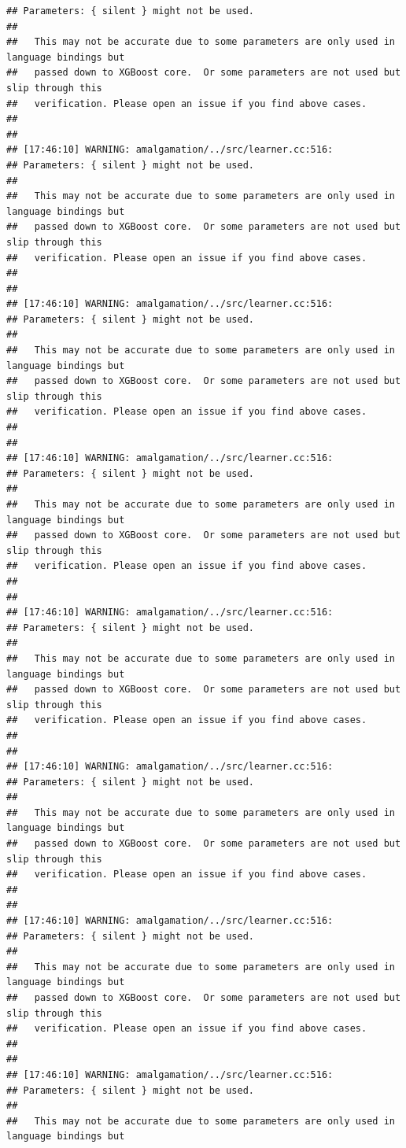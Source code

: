 \documentclass[AMS,STIX2COL]{WileyNJD-v2}\usepackage[]{graphicx}\usepackage[]{color}
\makeatletter
\newenvironment{kframe}{%
 \def\at@end@of@kframe{}%
 \ifinner\ifhmode%
  \def\at@end@of@kframe{\end{minipage}}%
  \begin{minipage}{\columnwidth}%
 \fi\fi%
 \def\FrameCommand##1{\hskip\@totalleftmargin \hskip-\fboxsep
 \colorbox{shadecolor}{##1}\hskip-\fboxsep
     \hskip-\linewidth \hskip-\@totalleftmargin \hskip\columnwidth}%
 \MakeFramed {\advance\hsize-\width
   \@totalleftmargin\z@ \linewidth\hsize
   \@setminipage}}%
 {\par\unskip\endMakeFramed%
 \at@end@of@kframe}
\newenvironment{knitrout}{}{} %
\makeatother
\begin{document}
\begin{knitrout}
\begin{kframe}
\begin{verbatim}
## Parameters: { silent } might not be used.
## 
##   This may not be accurate due to some parameters are only used in language bindings but
##   passed down to XGBoost core.  Or some parameters are not used but slip through this
##   verification. Please open an issue if you find above cases.
## 
## 
## [17:46:10] WARNING: amalgamation/../src/learner.cc:516: 
## Parameters: { silent } might not be used.
## 
##   This may not be accurate due to some parameters are only used in language bindings but
##   passed down to XGBoost core.  Or some parameters are not used but slip through this
##   verification. Please open an issue if you find above cases.
## 
## 
## [17:46:10] WARNING: amalgamation/../src/learner.cc:516: 
## Parameters: { silent } might not be used.
## 
##   This may not be accurate due to some parameters are only used in language bindings but
##   passed down to XGBoost core.  Or some parameters are not used but slip through this
##   verification. Please open an issue if you find above cases.
## 
## 
## [17:46:10] WARNING: amalgamation/../src/learner.cc:516: 
## Parameters: { silent } might not be used.
## 
##   This may not be accurate due to some parameters are only used in language bindings but
##   passed down to XGBoost core.  Or some parameters are not used but slip through this
##   verification. Please open an issue if you find above cases.
## 
## 
## [17:46:10] WARNING: amalgamation/../src/learner.cc:516: 
## Parameters: { silent } might not be used.
## 
##   This may not be accurate due to some parameters are only used in language bindings but
##   passed down to XGBoost core.  Or some parameters are not used but slip through this
##   verification. Please open an issue if you find above cases.
## 
## 
## [17:46:10] WARNING: amalgamation/../src/learner.cc:516: 
## Parameters: { silent } might not be used.
## 
##   This may not be accurate due to some parameters are only used in language bindings but
##   passed down to XGBoost core.  Or some parameters are not used but slip through this
##   verification. Please open an issue if you find above cases.
## 
## 
## [17:46:10] WARNING: amalgamation/../src/learner.cc:516: 
## Parameters: { silent } might not be used.
## 
##   This may not be accurate due to some parameters are only used in language bindings but
##   passed down to XGBoost core.  Or some parameters are not used but slip through this
##   verification. Please open an issue if you find above cases.
## 
## 
## [17:46:10] WARNING: amalgamation/../src/learner.cc:516: 
## Parameters: { silent } might not be used.
## 
##   This may not be accurate due to some parameters are only used in language bindings but

\end{verbatim}
\end{kframe}
\end{knitrout}
\end{document}
